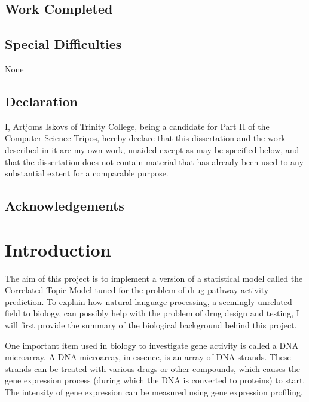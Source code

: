 \documentclass[12pt,a4paper,twoside,openright]{report}
\begin{document}
\section*{Work Completed}

\section*{Special Difficulties}
None
 
\newpage
\section*{Declaration}

I, Artjoms Iskovs of Trinity College, being a candidate for Part II of the Computer
Science Tripos, hereby declare that this dissertation and the work described in it are my own work,
unaided except as may be specified below, and that the dissertation does not contain material that has already been used to any substantial
extent for a comparable purpose.

\bigskip
{}

\medskip
{}

\tableofcontents

\listoffigures

\newpage
\section*{Acknowledgements}



\pagestyle{headings}

\chapter{Introduction}

The aim of this project is to implement a version of a statistical model called the Correlated Topic Model tuned for the problem of drug-pathway activity prediction. To explain how natural language processing, a seemingly unrelated field to biology, can possibly help with the problem of drug design and testing, I will first provide the summary of the biological background behind this project.

One important item used in biology to investigate gene activity is called a DNA microarray. A DNA microarray, in essence, is an array of DNA strands. These strands can be treated with various drugs or other compounds, which causes the gene expression process (during which the DNA is converted to proteins) to start. The intensity of gene expression can be measured using gene expression profiling.
\end{document}
